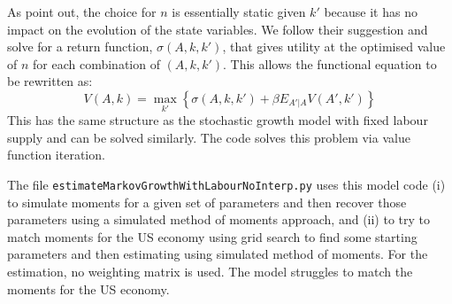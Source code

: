 \documentclass[12pt]{article}
\begin{document}
As \citet{adda2003dynamic} point out, the choice for \(n\) is essentially static given \(k'\) because it has no impact on the evolution of the state variables. We follow their suggestion and solve for a return function, \(\sigma(A, k, k')\), that gives utility at the optimised value of \(n\) for each combination of \((A, k, k')\). This allows the functional equation to be rewritten as:
\begin{equation}
	V(A, k) = \max_{k'} \left\{ \sigma(A, k, k') + \beta E_{A' | A} V(A', k') \right\}
\end{equation}
This has the same structure as the stochastic growth model with fixed labour supply and can be solved similarly. The code solves this problem via value function iteration.

The file \texttt{estimateMarkovGrowthWithLabourNoInterp.py} uses this model code (i) to simulate moments for a given set of parameters and then recover those parameters using a simulated method of moments approach, and (ii) to try to match moments for the US economy using grid search to find some starting parameters and then estimating using simulated method of moments. For the estimation, no weighting matrix is used. The model struggles to match the moments for the US economy.



\end{document}
